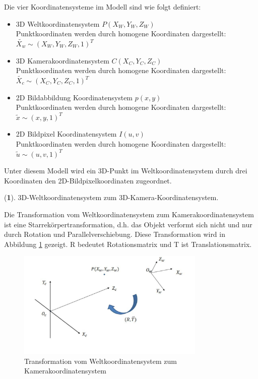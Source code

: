 Die vier Koordinatensysteme im Modell sind wie folgt definiert:

\begin{itemize}
	\item 3D Weltkoordinatensystem $P(X_W,Y_W,Z_W)$ \\
	Punktkoordinaten werden durch homogene Koordinaten dargestellt: $\widetilde{X_w}\sim(X_W,Y_W,Z_W,1)^T$
	\item 3D Kamerakoordinatensystem $C(X_C,Y_C,Z_C)$\\
	Punktkoordinaten werden durch homogene Koordinaten dargestellt: $\widetilde{X_c}\sim(X_C,Y_C,Z_C,1)^T$
	\item 2D Bildabbildung Koordinatensystem $p(x,y)$\\
	Punktkoordinaten werden durch homogene Koordinaten dargestellt: $\widetilde{x}\sim(x,y,1)^T$
	\item 2D Bildpixel Koordinatensystem $I(u,v)$\\
	Punktkoordinaten werden durch homogene Koordinaten dargestellt: $\widetilde{u}\sim(u,v,1)^T$
\end{itemize}

Unter diesem Modell wird ein 3D-Punkt im Weltkoordinatensystem durch drei Koordinaten den 2D-Bildpixelkoordinaten zugeordnet.

(\textbf{1}). 3D-Weltkoordinatensystem zum 3D-Kamera-Koordinatensystem.

Die Transformation vom Weltkoordinatensystem zum Kamerakoordinatensystem ist eine Starrekörpertransformation, d.h. das Objekt verformt sich nicht und nur durch Rotation und Parallelverschiebung. Diese Transformation wird in Abbildung \ref{fig:WzuC} gezeigt. R bedeutet Rotationsmatrix und T ist Translationsmatrix.

\begin{figure}[htb]
 \centering 
 \includegraphics[keepaspectratio,width=0.8\textwidth]{images/4_ZweiteErfahrung/Kamera/WzuC.pdf}
 \caption{Transformation vom Weltkoordinatensystem zum Kamerakoordinatensystem}
 \label{fig:WzuC}
\end{figure} 

